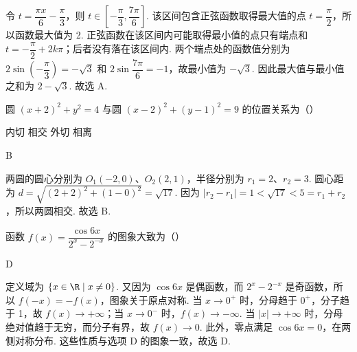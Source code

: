 \begin{solution}
令 \(t=\dfrac{\pi x}{6}-\dfrac{\pi}{3}\)，则 \(t\in\left[-\dfrac\pi3,\dfrac{7\pi}{6}\right]\). 该区间包含正弦函数取得最大值的点 \(t=\dfrac\pi2\)，所以函数最大值为 2. 正弦函数在该区间内可能取得最小值的点只有端点和 \(t=-\dfrac\pi2+2k\pi\)；后者没有落在该区间内. 两个端点处的函数值分别为 \(2\sin\left(-\dfrac\pi3\right)=-\sqrt3\) 和 \(2\sin\dfrac{7\pi}{6}=-1\)，故最小值为 \(-\sqrt3\). 因此最大值与最小值之和为 \(2-\sqrt3\). 故选 A.
\end{solution}

\begin{problem}
圆 \((x+2)^2+y^2=4\) 与圆 \((x-2)^2+(y-1)^2=9\) 的位置关系为（\quad）

\choices
    {内切}
    {相交}
    {外切}
    {相离}
\end{problem}

\begin{answer}
B
\end{answer}

\begin{solution}
两圆的圆心分别为 \(O_1(-2,0)\)、\(O_2(2,1)\)，半径分别为 \(r_1=2\)、\(r_2=3\). 圆心距为 \(d=\sqrt{(2+2)^2+(1-0)^2}=\sqrt{17}\). 因为 \(|r_2-r_1|=1<\sqrt{17}<5=r_1+r_2\)，所以两圆相交. 故选 B.
\end{solution}

\begin{problem}
函数 \(f(x)=\dfrac{\cos6x}{2^x-2^{-x}}\) 的图象大致为（\quad）

    {}
    {}
    {}
\end{problem}

\begin{answer}
D
\end{answer}

\begin{solution}
定义域为 \(\{x\in\R\mid x\ne0\}\). 又因为 \(\cos6x\) 是偶函数，而 \(2^x-2^{-x}\) 是奇函数，所以 \(f(-x)=-f(x)\)，图象关于原点对称. 当 \(x\to0^+\) 时，分母趋于 \(0^+\)，分子趋于 1，故 \(f(x)\to+\infty\)；当 \(x\to0^-\) 时，\(f(x)\to-\infty\). 当 \(|x|\to+\infty\) 时，分母绝对值趋于无穷，而分子有界，故 \(f(x)\to0\). 此外，零点满足 \(\cos6x=0\)，在两侧对称分布. 这些性质与选项 D 的图象一致，故选 D.
\end{solution}

